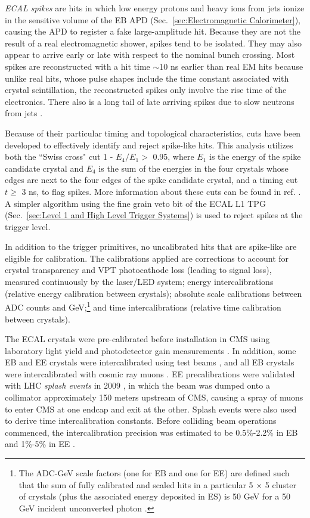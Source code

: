 \documentclass[dissertation.tex]{subfiles}
\begin{document}
\textit{ECAL spikes} are hits in which low energy protons and heavy ions from jets ionize in the sensitive volume of the EB APD (Sec.~\ref{sec:Electromagnetic Calorimeter}), causing the APD to register a fake large-amplitude hit.  Because they are not the result of a real electromagnetic shower, spikes tend to be isolated.  They may also appear to arrive early or late with respect to the nominal bunch crossing.  Most spikes are reconstructed with a hit time $\sim$10 ns earlier than real EM hits because unlike real hits, whose pulse shapes include the time constant associated with crystal scintillation, the reconstructed spikes only involve the rise time of the electronics.  There also is a long tail of late arriving spikes due to slow neutrons from jets \cite{CMS-NOTE-2010-012}.

Because of their particular timing and topological characteristics, cuts have been developed to effectively identify and reject spike-like hits.  This analysis utilizes both the ``Swiss cross" cut 1 - $E_{4}/E_{1} >$ 0.95, where $E_{1}$ is the energy of the spike candidate crystal and $E_{4}$ is the sum of the energies in the four crystals whose edges are next to the four edges of the spike candidate crystal, and a timing cut $t \geq$ 3 ns, to flag spikes.  More information about these cuts can be found in ref. \cite{CMS-NOTE-2010-012}.  A simpler algorithm using the fine grain veto bit of the ECAL L1 TPG (Sec.~\ref{sec:Level 1 and High Level Trigger Systems}) is used to reject spikes at the trigger level.

In addition to the trigger primitives, no uncalibrated hits that are spike-like are eligible for calibration.  The calibrations applied are corrections to account for crystal transparency and VPT photocathode loss (leading to signal loss), measured continuously by the laser/LED system; energy intercalibrations (relative energy calibration between crystals); absolute scale calibrations between ADC counts and GeV;\footnote{The ADC-GeV scale factors (one for EB and one for EE) are defined such that the sum of fully calibrated and scaled hits in a particular 5 $\times$ 5 cluster of crystals (plus the associated energy deposited in ES) is 50 GeV for a 50 GeV incident unconverted photon \cite{calibration_IN}.} and time intercalibrations (relative time calibration between crystals).

The ECAL crystals were pre-calibrated before installation in CMS using laboratory light yield and photodetector gain measurements \cite{springerlink:10.1140/epjcd/s2005-02-011-3}.  In addition, some EB and EE crystals were intercalibrated using test beams \cite{1748-0221-3-10-P10007}, and all EB crystals were intercalibrated with cosmic ray muons \cite{5402068}.  EE precalibrations were validated with LHC \textit{splash events} in 2009 \cite{5402068, 1748-0221-5-03-T03010}, in which the beam was dumped onto a collimator approximately 150 meters upstream of CMS, causing a spray of muons to enter CMS at one endcap and exit at the other.  Splash events were also used to derive time intercalibration constants.  Before colliding beam operations commenced, the intercalibration precision was estimated to be 0.5\%-2.2\% in EB and 1\%-5\% in EE \cite{1742-6596-293-1-012045}.
\end{document}
